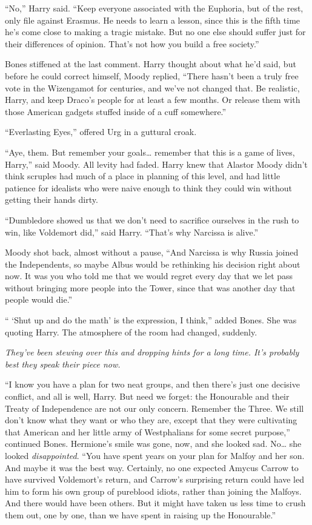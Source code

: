 ``No,'' Harry said. ``Keep everyone associated with the Euphoria, but of
the rest, only file against Erasmus. He needs to learn a lesson, since
this is the fifth time he's come close to making a tragic mistake. But
no one else should suffer just for their differences of opinion. That's
not how you build a free society.''

Bones stiffened at the last comment. Harry thought about what he'd said,
but before he could correct himself, Moody replied, ``There hasn't been
a truly free vote in the Wizengamot for centuries, and we've not changed
that. Be realistic, Harry, and keep Draco's people for at least a few
months. Or release them with those American gadgets stuffed inside of a
cuff somewhere.''

``Everlasting Eyes,'' offered Urg in a guttural croak.

``Aye, them. But remember your goals\ldots{} remember that this is a
game of lives, Harry,'' said Moody. All levity had faded. Harry knew
that Alastor Moody didn't think scruples had much of a place in planning
of this level, and had little patience for idealists who were naive
enough to think they could win without getting their hands dirty.

``Dumbledore showed us that we don't need to sacrifice ourselves in the
rush to win, like Voldemort did,'' said Harry. ``That's why Narcissa is
alive.''

Moody shot back, almost without a pause, ``And Narcissa is why Russia
joined the Independents, so maybe Albus would be rethinking his decision
right about now. It was you who told me that we would regret every day
that we let pass without bringing more people into the Tower, since that
was another day that people would die.''

`` `Shut up and do the math' is the expression, I think,'' added Bones.
She was quoting Harry. The atmosphere of the room had changed, suddenly.

\emph{They've been stewing over this and dropping hints for a long time.
It's probably best they speak their piece now.}

``I know you have a plan for two neat groups, and then there's just one
decisive conflict, and all is well, Harry. But need we forget: the
Honourable and their Treaty of Independence are not our only concern.
Remember the Three. We still don't know what they want or who they are,
except that they were cultivating that American and her little army of
Westphalians for some secret purpose,'' continued Bones. Hermione's
smile was gone, now, and she looked sad. No\ldots{} she looked
\emph{disappointed}. ``You have spent years on your plan for Malfoy and
her son. And maybe it was the best way. Certainly, no one expected
Amycus Carrow to have survived Voldemort's return, and Carrow's
surprising return could have led him to form his own group of pureblood
idiots, rather than joining the Malfoys. And there would have been
others. But it might have taken us less time to crush them out, one by
one, than we have spent in raising up the Honourable.''

